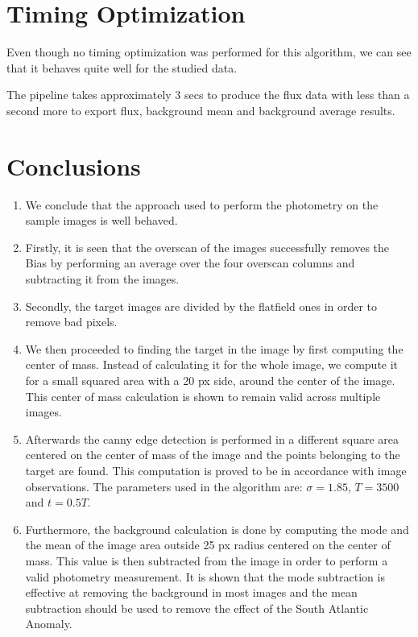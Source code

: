 \documentclass{aa}
\begin{document}
\section{Timing Optimization}

Even though no timing optimization was performed for this algorithm, we can see that it behaves quite well for the studied data.

The pipeline takes approximately 3 secs to produce the flux data with less than a second more to export flux, background mean and background average results.

\section{Conclusions}

\begin{enumerate}
	\item We conclude that the approach used to perform the photometry on the sample images is well behaved.
	\item Firstly, it is seen that the overscan of the images successfully removes the Bias by performing an average over the four overscan columns and subtracting it from the images.
	\item Secondly, the target images are divided by the flatfield ones in order to remove bad pixels.
	\item We then proceeded to finding the target in the image by first computing the center of mass. Instead of calculating it for the whole image, we compute it for a small squared area with a 20 px side, around the center of the image. This center of mass calculation is shown to remain valid across multiple images.
	\item Afterwards the canny edge detection is performed in a different square area centered on the center of mass of the image and the points belonging to the target are found. This computation is proved to be in accordance with image observations. The parameters used in the algorithm are: $\sigma = 1.85$, $T = 3500$ and $t = 0.5T$.
	\item Furthermore, the background calculation is done by computing the mode and the mean of the image area outside 25 px radius centered on the center of mass. This value is then subtracted from the image in order to perform a valid photometry measurement. It is shown that the mode subtraction is effective at removing the background in most images and the mean subtraction should be used to remove the effect of the South Atlantic Anomaly.

\end{enumerate}
\end{document}
